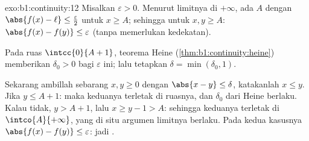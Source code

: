 \begin{solution}{exo:b1:continuity:12}
Misalkan $\varepsilon > 0$. Menurut limitnya di $+\infty$, ada $A$ dengan
$\abs{f(x) - \ell} \leq \frac\varepsilon2$ untuk $x \geq A$; sehingga untuk
$x, y \geq A$: $\abs{f(x) - f(y)} \leq \varepsilon$ (tanpa memerlukan
kedekatan).

Pada ruas $\intcc{0}{A + 1}$, teorema Heine
(\cref{thm:b1:continuity:heine}) memberikan $\delta_0 > 0$ bagi
$\varepsilon$ ini; lalu tetapkan $\delta = \min(\delta_0, 1)$.

Sekarang ambillah sebarang $x, y \geq 0$ dengan $\abs{x - y} \leq \delta$, katakanlah $x
\leq y$. Jika $y \leq A + 1$: maka keduanya terletak di ruasnya, dan $\delta_0$
dari Heine berlaku. Kalau tidak, $y > A + 1$, lalu $x \geq y - 1 >
A$: sehingga keduanya terletak di $\intco{A}{+\infty}$, yang di situ argumen limitnya
berlaku. Pada kedua kasusnya $\abs{f(x) - f(y)} \leq \varepsilon$: jadi .
\end{solution}

